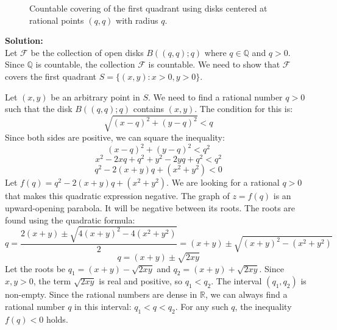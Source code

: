 \begin{figure}[h]
\centering
{}
\caption{Countable covering of the first quadrant using disks centered at rational points $(q,q)$ with radius $q$.}
\end{figure}

\bigskip\noindent\textbf{Solution:}\\
Let $\mathcal{F}$ be the collection of open disks $B((q,q); q)$ where $q \in \mathbb{Q}$ and $q > 0$. Since $\mathbb{Q}$ is countable, the collection $\mathcal{F}$ is countable. We need to show that $\mathcal{F}$ covers the first quadrant $S = \{(x, y) : x > 0, y > 0\}$.

Let $(x, y)$ be an arbitrary point in $S$. We need to find a rational number $q > 0$ such that the disk $B((q,q); q)$ contains $(x, y)$. The condition for this is:
$$\sqrt{(x-q)^2 + (y-q)^2} < q$$
Since both sides are positive, we can square the inequality:
$$(x-q)^2 + (y-q)^2 < q^2$$
$$x^2 - 2xq + q^2 + y^2 - 2yq + q^2 < q^2$$
$$q^2 - 2(x+y)q + (x^2+y^2) < 0$$
Let $f(q) = q^2 - 2(x+y)q + (x^2+y^2)$. We are looking for a rational $q > 0$ that makes this quadratic expression negative. The graph of $z=f(q)$ is an upward-opening parabola. It will be negative between its roots. The roots are found using the quadratic formula:
$$q = \frac{2(x+y) \pm \sqrt{4(x+y)^2 - 4(x^2+y^2)}}{2} = (x+y) \pm \sqrt{(x+y)^2 - (x^2+y^2)}$$
$$q = (x+y) \pm \sqrt{2xy}$$
Let the roots be $q_1 = (x+y) - \sqrt{2xy}$ and $q_2 = (x+y) + \sqrt{2xy}$. Since $x,y > 0$, the term $\sqrt{2xy}$ is real and positive, so $q_1 < q_2$. The interval $(q_1, q_2)$ is non-empty.
Since the rational numbers are dense in $\mathbb{R}$, we can always find a rational number $q$ in this interval: $q_1 < q < q_2$. For any such $q$, the inequality $f(q) < 0$ holds.

